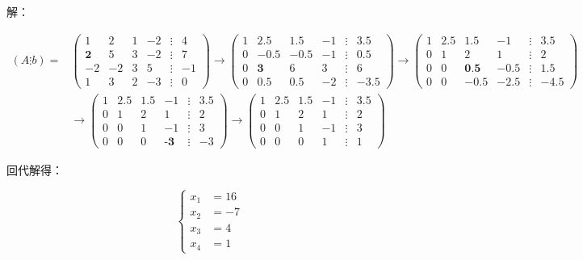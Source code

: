 \documentclass{article}
\begin{document}
\noindent 解：

$$
\begin{aligned}
(A\vdots b)
=&
\begin{pmatrix}
    1 & 2 & 1 & -2 & \vdots & 4 \\
    \textbf{2} & 5 & 3 & -2 & \vdots & 7 \\
    -2 & -2 & 3 & 5 & \vdots & -1 \\
    1 & 3 & 2 & -3 & \vdots & 0
\end{pmatrix}
\longrightarrow
\begin{pmatrix}
    1 & 2.5 & 1.5 & -1 & \vdots & 3.5 \\
    0 & -0.5 & -0.5 & -1 & \vdots & 0.5 \\
    0 & \textbf{3} & 6 & 3 & \vdots & 6 \\
    0 & 0.5 & 0.5 & -2 & \vdots & -3.5
\end{pmatrix}
\longrightarrow
\begin{pmatrix}
    1 & 2.5 & 1.5 & -1 & \vdots & 3.5 \\
    0 & 1 & 2 & 1 & \vdots & 2 \\
    0 & 0 & \textbf{0.5} & -0.5 & \vdots & 1.5 \\
    0 & 0 & -0.5 & -2.5 & \vdots & -4.5
\end{pmatrix}
\\
&\longrightarrow
\begin{pmatrix}
    1 & 2.5 & 1.5 & -1 & \vdots & 3.5 \\
    0 & 1 & 2 & 1 & \vdots & 2 \\
    0 & 0 & 1 & -1 & \vdots & 3 \\
    0 & 0 & 0 & \textbf{-3} & \vdots & -3
\end{pmatrix}
\longrightarrow
\begin{pmatrix}
    1 & 2.5 & 1.5 & -1 & \vdots & 3.5 \\
    0 & 1 & 2 & 1 & \vdots & 2 \\
    0 & 0 & 1 & -1 & \vdots & 3 \\
    0 & 0 & 0 & 1 & \vdots & 1
\end{pmatrix}
\end{aligned}
$$

回代解得：

$$
\left\{
\begin{aligned}
    x_1 &= 16 \\
    x_2 &= -7 \\
    x_3 &= 4 \\
    x_4 &= 1
\end{aligned}
\right.
$$\\
\end{document}
